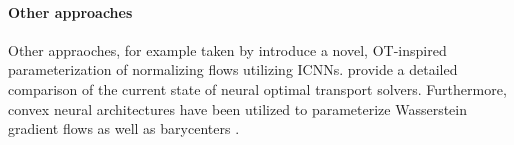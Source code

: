 \paragraph{Other approaches}
Other appraoches, for example taken by \citet{huang2021convex} introduce a novel, OT-inspired parameterization of normalizing flows utilizing ICNNs.
\citet{korotin2021neural} provide a detailed comparison of the current state of neural optimal transport solvers.
Furthermore, convex neural architectures have been utilized to parameterize Wasserstein gradient flows
\citep{bunne2022proximal, alvarez2021optimizing, mokrov2021large} as well as barycenters \citep{fan2020scalable}.

